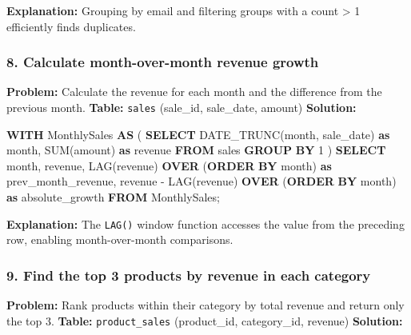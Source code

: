 \documentclass[
  11pt,
  openany,
  oneside]{book}
\newenvironment{Shaded}{}{}
\newcommand{\DataTypeTok}[1]{\textcolor[rgb]{0.56,0.13,0.00}{#1}}
\newcommand{\DecValTok}[1]{\textcolor[rgb]{0.25,0.63,0.44}{#1}}
\newcommand{\FunctionTok}[1]{\textcolor[rgb]{0.02,0.16,0.49}{#1}}
\newcommand{\KeywordTok}[1]{\textcolor[rgb]{0.00,0.44,0.13}{\textbf{#1}}}
\newcommand{\NormalTok}[1]{#1}
\newcommand{\OperatorTok}[1]{\textcolor[rgb]{0.40,0.40,0.40}{#1}}
\newcommand{\StringTok}[1]{\textcolor[rgb]{0.25,0.44,0.63}{#1}}
\begin{document}
\textbf{Explanation:} Grouping by email and filtering groups with a
count \textgreater{} 1 efficiently finds duplicates.

\subsubsection{8. Calculate month-over-month revenue
growth}\label{calculate-month-over-month-revenue-growth}

\textbf{Problem:} Calculate the revenue for each month and the
difference from the previous month. \textbf{Table:} \texttt{sales}
(sale\_id, sale\_date, amount) \textbf{Solution:}

\begin{Shaded}
\begin{Highlighting}[]
\KeywordTok{WITH}\NormalTok{ MonthlySales }\KeywordTok{AS}\NormalTok{ (}
    \KeywordTok{SELECT}\NormalTok{ DATE\_TRUNC(}\StringTok{\textquotesingle{}month\textquotesingle{}}\NormalTok{, sale\_date) }\KeywordTok{as} \DataTypeTok{month}\NormalTok{, }\FunctionTok{SUM}\NormalTok{(amount) }\KeywordTok{as}\NormalTok{ revenue}
    \KeywordTok{FROM}\NormalTok{ sales }
    \KeywordTok{GROUP} \KeywordTok{BY} \DecValTok{1}
\NormalTok{)}
\KeywordTok{SELECT} 
    \DataTypeTok{month}\NormalTok{, }
\NormalTok{    revenue, }
    \FunctionTok{LAG}\NormalTok{(revenue) }\KeywordTok{OVER}\NormalTok{ (}\KeywordTok{ORDER} \KeywordTok{BY} \DataTypeTok{month}\NormalTok{) }\KeywordTok{as}\NormalTok{ prev\_month\_revenue,}
\NormalTok{    revenue }\OperatorTok{{-}} \FunctionTok{LAG}\NormalTok{(revenue) }\KeywordTok{OVER}\NormalTok{ (}\KeywordTok{ORDER} \KeywordTok{BY} \DataTypeTok{month}\NormalTok{) }\KeywordTok{as}\NormalTok{ absolute\_growth}
\KeywordTok{FROM}\NormalTok{ MonthlySales;}
\end{Highlighting}
\end{Shaded}

\textbf{Explanation:} The \texttt{LAG()} window function accesses the
value from the preceding row, enabling month-over-month comparisons.

\subsubsection{9. Find the top 3 products by revenue in each
category}\label{find-the-top-3-products-by-revenue-in-each-category}

\textbf{Problem:} Rank products within their category by total revenue
and return only the top 3. \textbf{Table:} \texttt{product\_sales}
(product\_id, category\_id, revenue) \textbf{Solution:}
\end{document}
